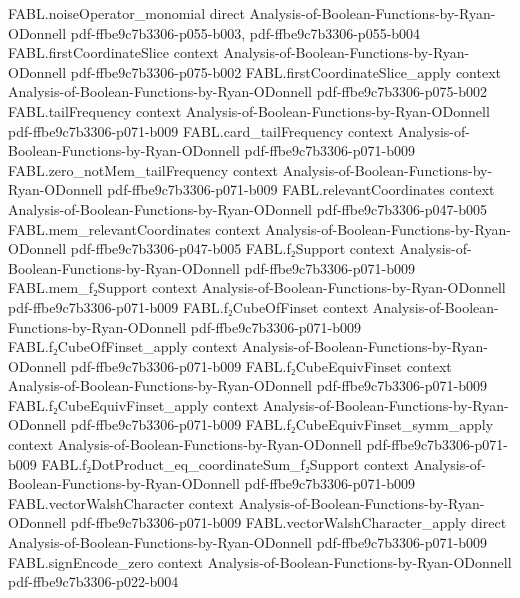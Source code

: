 \begin{theorem}
  {FABL.noiseOperator_monomial}
  {direct}
  {Analysis-of-Boolean-Functions-by-Ryan-ODonnell}
  {pdf-ffbe9c7b3306-p055-b003,
    pdf-ffbe9c7b3306-p055-b004}
\proofstep
  {FABL.firstCoordinateSlice}
  {context}
  {Analysis-of-Boolean-Functions-by-Ryan-ODonnell}
  {pdf-ffbe9c7b3306-p075-b002}
\proofstep
  {FABL.firstCoordinateSlice_apply}
  {context}
  {Analysis-of-Boolean-Functions-by-Ryan-ODonnell}
  {pdf-ffbe9c7b3306-p075-b002}
\proofstep
  {FABL.tailFrequency}
  {context}
  {Analysis-of-Boolean-Functions-by-Ryan-ODonnell}
  {pdf-ffbe9c7b3306-p071-b009}
\proofstep
  {FABL.card_tailFrequency}
  {context}
  {Analysis-of-Boolean-Functions-by-Ryan-ODonnell}
  {pdf-ffbe9c7b3306-p071-b009}
\proofstep
  {FABL.zero_notMem_tailFrequency}
  {context}
  {Analysis-of-Boolean-Functions-by-Ryan-ODonnell}
  {pdf-ffbe9c7b3306-p071-b009}
\proofstep
  {FABL.relevantCoordinates}
  {context}
  {Analysis-of-Boolean-Functions-by-Ryan-ODonnell}
  {pdf-ffbe9c7b3306-p047-b005}
\proofstep
  {FABL.mem_relevantCoordinates}
  {context}
  {Analysis-of-Boolean-Functions-by-Ryan-ODonnell}
  {pdf-ffbe9c7b3306-p047-b005}
\proofstep
  {FABL.f₂Support}
  {context}
  {Analysis-of-Boolean-Functions-by-Ryan-ODonnell}
  {pdf-ffbe9c7b3306-p071-b009}
\proofstep
  {FABL.mem_f₂Support}
  {context}
  {Analysis-of-Boolean-Functions-by-Ryan-ODonnell}
  {pdf-ffbe9c7b3306-p071-b009}
\proofstep
  {FABL.f₂CubeOfFinset}
  {context}
  {Analysis-of-Boolean-Functions-by-Ryan-ODonnell}
  {pdf-ffbe9c7b3306-p071-b009}
\proofstep
  {FABL.f₂CubeOfFinset_apply}
  {context}
  {Analysis-of-Boolean-Functions-by-Ryan-ODonnell}
  {pdf-ffbe9c7b3306-p071-b009}
\proofstep
  {FABL.f₂CubeEquivFinset}
  {context}
  {Analysis-of-Boolean-Functions-by-Ryan-ODonnell}
  {pdf-ffbe9c7b3306-p071-b009}
\proofstep
  {FABL.f₂CubeEquivFinset_apply}
  {context}
  {Analysis-of-Boolean-Functions-by-Ryan-ODonnell}
  {pdf-ffbe9c7b3306-p071-b009}
\proofstep
  {FABL.f₂CubeEquivFinset_symm_apply}
  {context}
  {Analysis-of-Boolean-Functions-by-Ryan-ODonnell}
  {pdf-ffbe9c7b3306-p071-b009}
\proofstep
  {FABL.f₂DotProduct_eq_coordinateSum_f₂Support}
  {context}
  {Analysis-of-Boolean-Functions-by-Ryan-ODonnell}
  {pdf-ffbe9c7b3306-p071-b009}
\proofstep
  {FABL.vectorWalshCharacter}
  {context}
  {Analysis-of-Boolean-Functions-by-Ryan-ODonnell}
  {pdf-ffbe9c7b3306-p071-b009}
\proofstep
  {FABL.vectorWalshCharacter_apply}
  {direct}
  {Analysis-of-Boolean-Functions-by-Ryan-ODonnell}
  {pdf-ffbe9c7b3306-p071-b009}
\proofstep
  {FABL.signEncode_zero}
  {context}
  {Analysis-of-Boolean-Functions-by-Ryan-ODonnell}
  {pdf-ffbe9c7b3306-p022-b004}
\proofstep

\end{theorem}
